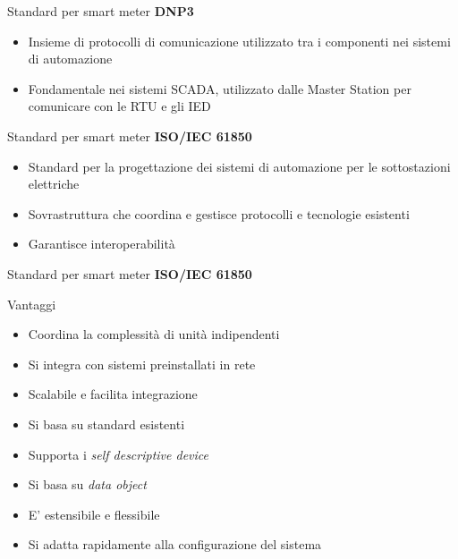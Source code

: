 \begin{frame}{Standard per smart meter}
\textbf{DNP3}
	\begin{itemize}[<+- | alert@+>]
		\item Insieme di protocolli di comunicazione utilizzato tra i componenti nei sistemi di automazione
		\item Fondamentale nei sistemi SCADA, utilizzato dalle Master Station per comunicare con le RTU e gli IED
	\end{itemize}
\end{frame}

\begin{frame}{Standard per smart meter}
	\textbf{ISO/IEC 61850}
	\begin{itemize}[<+- | alert@+>]
		\item Standard per la progettazione dei sistemi di automazione per le sottostazioni elettriche
		\item Sovrastruttura che coordina e gestisce protocolli e tecnologie esistenti
		\item Garantisce interoperabilità
	\end{itemize}
\end{frame}

\begin{frame}{Standard per smart meter}
	\textbf{ISO/IEC 61850}
	\begin{block}{Vantaggi}
	\begin{itemize}[<+- | alert@+>]
		\item Coordina la complessità di unità indipendenti
		\item Si integra con sistemi preinstallati in rete
		\item Scalabile e facilita integrazione
		\item Si basa su standard esistenti
		\item Supporta i \textit{self descriptive device}
		\item Si basa su \textit{data object}
		\item E' estensibile e flessibile
		\item Si adatta rapidamente alla configurazione del sistema
	\end{itemize}
	\end{block}
\end{frame}


